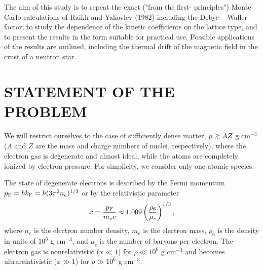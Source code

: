 The aim of this study is to repeat the exact ("from the first-
principles") Monte Carlo calculations of Raikh and Yakovlev (1982)
including the Debye -- Waller factor, to study the dependence 
of the kinetic coefficients on the lattice type,
and to present the results in the form suitable for practical use.
Possible applications of the results are outlined, including 
the thermal drift of the magnetic field in the crust of a
neutron star.

\section{STATEMENT OF THE PROBLEM}
We will restrict ourselves to the case of sufficiently dense
matter, $\rho \ga AZ$ g cm$^{-3}$ ($A$ and $Z$ are the mass and charge
numbers of nuclei, respectively), where the electron gas is
degenerate and almost ideal, while the atoms are completely ionized
by electron pressure. For simplicity, we consider only one
atomic species.

The state of degenerate electrons is described by the Fermi
momentum $\mbox{$p_{\rm F}$} = \hbar k_{\rm F} = \hbar (3 \pi^2 n_e)^{1/3}$ 
or by the relativistic parameter
%
\begin{equation}
        x = {\mbox{$p_{\rm F}$} \over m_e c} \approx
            1.009 \left({\rho_6  \over \mu_e} \right)^{1/3},
\label{eq:x}
\end{equation}
%
where $n_e$ is the electron number density, $m_e$ is the electron
mass, $\rho_6$ is the density in units of $10^6$ g cm$^{-3}$, and
$\mu_e$ is the number of baryons per electron. The electron gas is
nonrelativistic ($x \ll 1$) for $\rho \ll 10^6$ g cm$^{-3}$ and becomes
ultrarelativistic ($x \gg 1$) for $\rho \gg 10^6$ g cm$^{-3}$.

